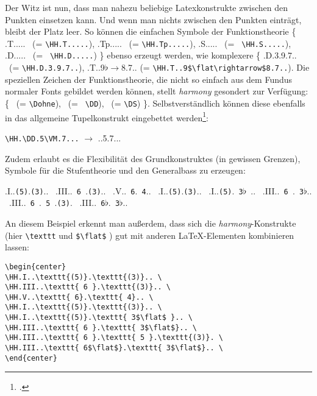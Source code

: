 Der Witz ist nun, dass man nahezu beliebige Latexkonstrukte zwischen den Punkten
einsetzen kann. Und wenn man nichts zwischen den Punkten einträgt, bleibt der
Platz leer. So können die einfachen Symbole der Funktionstheorie \{ \HH.T..... 
\ (= \texttt{\small \textbackslash{HH.T.....}}), \HH.Tp.....  \ (=
\texttt{\small \textbackslash{HH.Tp.....}}), \HH.S.....  \ (= \texttt{\small
\textbackslash{HH.S.....}}), \HH.D.....  \ (= \texttt{\small
\textbackslash{HH.D.....}}) \} ebenso erzeugt werden, wie komplexere \{
\HH.D.3.9.7..  \ (= \texttt{\small \textbackslash{HH.D.3.9.7..}}),
\HH.T..9$\flat\rightarrow$8.7..  (= \verb|\HH.T..9$\flat\rightarrow$8.7..|).
Die speziellen Zeichen der Funktionstheorie, die nicht so einfach aus dem Fundus
normaler Fonts gebildet werden können, stellt  \textit{harmony} gesondert zur
Verfügung:
\{ \Dohne  \ (= \texttt{\small \textbackslash{Dohne}}), \DD \ (= \texttt{\small
\textbackslash{DD}}), \DS  \ (= \texttt{\small \textbackslash{DS}}) \}.
Selbstverständlich können diese ebenfalls in das allgemeine Tupelkonstrukt
eingebettet werden\footcite[Vgl. dazu][6]{WegWeg2007a}:
\begin{center}
 \texttt{\textbackslash{HH}.\textbackslash{DD}.5\textbackslash{VM}.7...} 
 $\rightarrow$ \HH.\DD.5\VM.7...
\end{center}

Zudem erlaubt es die Flexibilität des Grundkonstruktes (in gewissen Grenzen),
Symbole für die Stufentheorie und den Generalbass zu erzeugen:

\begin{center}
\HH.I..\texttt{(5)}.\texttt{(3)}.. \ 
\HH.III..\texttt{ 6 }.\texttt{(3)}.. \ 
\HH.V..\texttt{ 6}.\texttt{ 4}.. \ 
\HH.I..\texttt{(5)}.\texttt{(3)}.. \ 
\HH.I..\texttt{(5)}.\texttt{ 3$\flat$ }.. \ 
\HH.III..\texttt{ 6 }.\texttt{ 3$\flat$}.. \ 
\HH.III..\texttt{ 6 }.\texttt{ 5 }.\texttt{(3)}. \ 
\HH.III..\texttt{ 6$\flat$}.\texttt{ 3$\flat$}.. \ 
\end{center}

An diesem Beispiel erkennt man außerdem, dass sich die
\textit{harmony}-Konstrukte (hier \texttt{\textbackslash{texttt}} und
\texttt{\$\textbackslash{flat}\$} ) gut mit anderen \LaTeX-Elementen kombinieren
lassen:
\begin{verbatim}
\begin{center}
\HH.I..\texttt{(5)}.\texttt{(3)}.. \ 
\HH.III..\texttt{ 6 }.\texttt{(3)}.. \ 
\HH.V..\texttt{ 6}.\texttt{ 4}.. \ 
\HH.I..\texttt{(5)}.\texttt{(3)}.. \ 
\HH.I..\texttt{(5)}.\texttt{ 3$\flat$ }.. \ 
\HH.III..\texttt{ 6 }.\texttt{ 3$\flat$}.. \ 
\HH.III..\texttt{ 6 }.\texttt{ 5 }.\texttt{(3)}. \ 
\HH.III..\texttt{ 6$\flat$}.\texttt{ 3$\flat$}.. \ 
\end{center}
\end{verbatim}

